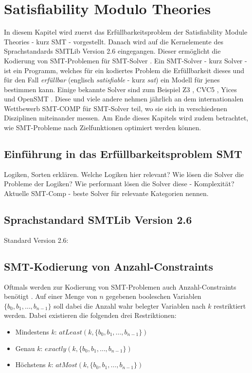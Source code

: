 \chapter{Satisfiability Modulo Theories}
\label{chapter:smt}

In diesem Kapitel wird zuerst das Erfüllbarkeitsproblem der Satisfiability Module Theories - kurz SMT - vorgestellt.
Danach wird auf die Kernelemente des Sprachstandards SMTLib Version 2.6 \cite{smtlib} eingegangen.
Dieser ermöglicht die Kodierung von SMT-Problemen für SMT-Solver \cite{smt}.
Ein SMT-Solver - kurz Solver - ist ein Programm, welches für ein kodiertes Problem die Erfüllbarkeit dieses und für den
Fall \textit{erfüllbar} (englisch \textit{satisfiable} - kurz \textit{sat}) ein Modell für jenes bestimmen kann.
Einige bekannte Solver sind zum Beispiel Z3 \cite{z3}, CVC5 \cite{cvc5}, Yices \cite{yices} und OpenSMT \cite{opensmt}.
Diese und viele andere nehmen jährlich an dem internationalen Wettbewerb SMT-COMP \cite{smtcomp} für SMT-Solver teil,
wo sie sich in verschiedenen Disziplinen miteinander messen.
Am Ende dieses Kapitels wird zudem betrachtet, wie SMT-Probleme nach Zielfunktionen optimiert werden können.

\section{Einführung in das Erfüllbarkeitsproblem SMT}
Logiken, Sorten erklären.
Welche Logiken hier relevant?
Wie lösen die Solver die Probleme der Logiken?
Wie performant lösen die Solver diese - Komplexität?
Aktuelle SMT-Comp - beste Solver für relevante Kategorien nennen.

\section{Sprachstandard SMTLib Version 2.6}
Standard Version 2.6: \cite{smtlib}

\section{SMT-Kodierung von Anzahl-Constraints}
\label{sec:smtcardinality}
Oftmals werden zur Kodierung von SMT-Problemen auch Anzahl-Constraints benötigt \cite{kovasznai}.
Auf einer Menge von $n$ gegebenen booleschen Variablen $\{b_0, b_1, \ldots, b_{n-1}\}$ soll dabei die Anzahl wahr belegter Variablen nach $k$ restriktiert werden.
Dabei existieren die folgenden drei Restriktionen:
\begin{itemize}
    \item Mindestens $k$: $atLeast(k, \{b_0, b_1, \ldots, b_{n-1}\})$
    \item Genau $k$: $exactly(k, \{b_0, b_1, \ldots, b_{n-1}\})$
    \item Höchstens $k$: $atMost(k, \{b_0, b_1, \ldots, b_{n-1}\})$
\end{itemize}

